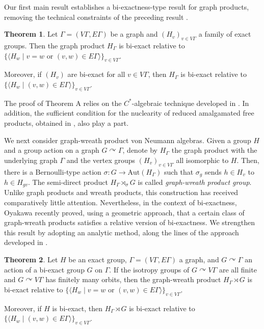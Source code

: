 \documentclass{amsart}
\theoremstyle{definition}
\newtheorem{mainthm}{Theorem}
\newcommand{\action}{\curvearrowright}
\begin{document}
Our first main result establishes a bi-exactness-type result for graph products, removing the technical constraints of the preceding result \cite[Theorem 4.9]{oya2}. 

\begin{mainthm}
Let $\Gamma=(V\Gamma, E\Gamma)$ be a graph and $(H_v)_{v\in V\Gamma}$ a family of exact groups.  Then the graph product $H_{\Gamma}$ is bi-exact relative to $\{ \langle H_w \mid v=w \text{ or }(v,w)\in E\Gamma \rangle\}_{v\in V\Gamma}$.  

Moreover, if $(H_v)$ are bi-exact for all $v\in V\Gamma$, then $H_{\Gamma}$ is bi-exact relative to $\{ \langle H_w \mid (v,w)\in E\Gamma \rangle\}_{v\in V\Gamma}$.  
\end{mainthm}

The proof of Theorem A relies on the $C^{\ast}$-algebraic 
technique developed in \cite{oza2}. 
In addition, the sufficient condition for the nuclearity of 
reduced amalgamated free products, obtained
in \cite{has},
also play a part. 


We next consider
graph-wreath product von Neumann algebras. 
Given a group $H$ and a group action on a graph $G\action \Gamma$, 
denote by $H_{\Gamma}$ the graph product with the underlying graph $\Gamma$
and the vertex groups $(H_v)_{v\in V\Gamma}$ all isomorphic to $H$. Then, there is a Bernoulli-type action
$\sigma : G \to \mathrm{Aut}(H_{\Gamma})$ such that $\sigma_g$ sends $h\in H_v$
to $h\in H_{gv}$. 
The semi-direct product $H_{\Gamma}\rtimes_{\sigma} G$ is called \emph{graph-wreath product group}. 
Unlike graph products and wreath products, 
this construction has received comparatively little attention. 
Nevertheless, in the context of bi-exactness, 
Oyakawa \cite[Theorem 5.7]{oya2} 
recently proved, using a geometric approach, that a certain class of graph-wreath products satisfies a relative version of bi-exactness. 
We strengthen this result by adopting an analytic method, along the lines of the approach developed in \cite{hik}. 

\begin{mainthm}
Let $H$ be an exact group, $\Gamma=(V\Gamma, E\Gamma)$ a graph, and $G\action \Gamma$ an action of a bi-exact group $G$ on $\Gamma$. If the isotropy groups of $G\curvearrowright V\Gamma$ are all finite and $G\action V\Gamma$ has finitely many orbits, then the graph-wreath product $H_{\Gamma}\rtimes G$ is bi-exact relative to $\{ \langle H_w \mid v=w \text{ or }(v,w)\in E\Gamma \rangle\}_{v\in V\Gamma}$. 

Moreover, if $H$ is bi-exact, then $H_{\Gamma}\rtimes G$ is bi-exact relative to $\{ \langle H_w \mid (v,w)\in E\Gamma \rangle\}_{v\in V\Gamma}$. 
\end{mainthm}
\end{document}
